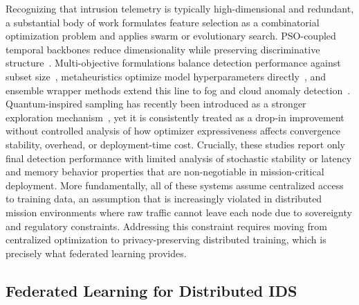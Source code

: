 \documentclass[conference]{IEEEtran}
\begin{document}
Recognizing that intrusion telemetry is typically high-dimensional
and redundant, a substantial body of work formulates feature
selection as a combinatorial optimization problem and applies swarm
or evolutionary search. PSO-coupled temporal backbones reduce
dimensionality while preserving discriminative
structure~\cite{donkoloptimization}. Multi-objective formulations
balance detection performance against subset
size~\cite{sezginmulti,raeisientropy}, metaheuristics optimize model
hyperparameters directly~\cite{kishoreimproved}, and ensemble wrapper
methods extend this line to fog and cloud anomaly
detection~\cite{yaseenefficient,bilalevaluation,maryenhancing,shrivashybrid}.
Quantum-inspired sampling has recently been introduced as a stronger
exploration mechanism~\cite{vivekquantum}, yet it is consistently
treated as a drop-in improvement without controlled analysis of how
optimizer expressiveness affects convergence stability, overhead, or
deployment-time cost. Crucially, these studies report only final
detection performance with limited analysis of stochastic stability
or latency and memory behavior properties that are non-negotiable
in mission-critical deployment. More fundamentally, all of these
systems assume centralized access to training data, an assumption
that is increasingly violated in distributed mission environments
where raw traffic cannot leave each node due to sovereignty and
regulatory constraints. Addressing this constraint requires moving
from centralized optimization to privacy-preserving distributed
training, which is precisely what federated learning provides.

\subsection{Federated Learning for Distributed IDS}
\end{document}

